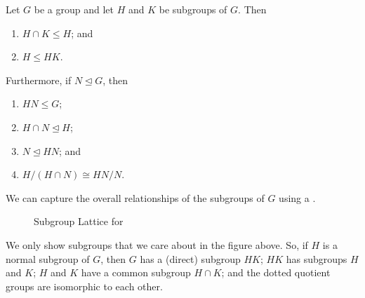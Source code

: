 \begin{theorem}[Isomorphism II]\label{thrm-isomorphism-2}
    Let $G$ be a group and let $H$ and $K$ be subgroups of $G$. Then
    \begin{enumerate}
        \item $H \cap K \leq H$; and
        \item $H \leq HK$.
    \end{enumerate}
    Furthermore, if $N \unlhd G$, then
    \begin{enumerate}[start=3]
        \item $HN \leq G$;
        \item $H \cap N \unlhd H$;
        \item $N \unlhd HN$; and
        \item $H / (H\cap N) \cong HN / N$.
    \end{enumerate}
\end{theorem}

We can capture the overall relationships of the subgroups of $G$ using a .

\begin{figure}[H]
    \centering
    \caption{Subgroup Lattice for }
\end{figure}

We only show subgroups that we care about in the figure above. So, if $H$ is a normal subgroup of $G$, then $G$ has a (direct) subgroup $HK$; $HK$ has subgroups $H$ and $K$; $H$ and $K$ have a common subgroup $H\cap K$; and the dotted quotient groups are isomorphic to each other.


